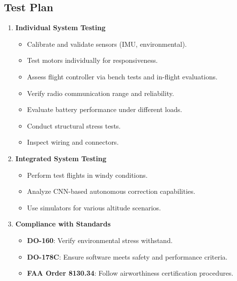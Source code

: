 \documentclass{article}
\begin{document}
\subsection{Test Plan}
\begin{enumerate}
    \item \textbf{Individual System Testing}
    \begin{itemize}
        \item Calibrate and validate sensors (IMU, environmental).
        \item Test motors individually for responsiveness.
        \item Assess flight controller via bench tests and in-flight evaluations.
        \item Verify radio communication range and reliability.
        \item Evaluate battery performance under different loads.
        \item Conduct structural stress tests.
        \item Inspect wiring and connectors.
    \end{itemize}
    \item \textbf{Integrated System Testing}
    \begin{itemize}
        \item Perform test flights in windy conditions.
        \item Analyze CNN-based autonomous correction capabilities.
        \item Use simulators for various altitude scenarios.
    \end{itemize}
    \item \textbf{Compliance with Standards}
    \begin{itemize}
        \item \textbf{DO-160}: Verify environmental stress withstand.
        \item \textbf{DO-178C}: Ensure software meets safety and performance criteria.
        \item \textbf{FAA Order 8130.34}: Follow airworthiness certification procedures.
    \end{itemize}
\end{enumerate}
\end{document}
